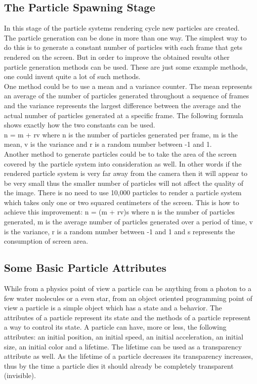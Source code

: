 \newpage
\subsection{The Particle Spawning Stage}
In this stage of the particle systems rendering cycle new particles are created. The particle generation can be done in more than one way. The simplest way to do this is to generate a constant number of particles with each frame that gets rendered on the screen. But in order to improve the obtained results other particle generation methods can be used. These are just some example methods, one could invent quite a lot of such methods.\\

One method could be to use a mean and a variance counter. The mean represents an average of the number of particles generated throughout a sequence of frames and the variance represents the largest difference between the average and the actual number of particles generated at a specific frame. The following formula shows exactly how the two constants can be used.\\
n = m + rv where n is the number of particles generated per frame, m is the mean, v is the variance and r is a random number between -1 and 1.\\

Another method to generate particles could be to take the area of the screen covered by the particle system into consideration as well. In other words if the rendered particle system is very far away from the camera then it will appear to be very small thus the smaller number of particles will not affect the quality of the image. There is no need to use 10,000 particles to render a particle system which takes only one or two squared centimeters of the screen. This is how to achieve this improvement: n = (m + rv)s where n is the number of particles generated, m is the average number of particles generated over a period of time, v is the variance, r is a random number between -1 and 1 and s represents the consumption of screen area.\\

\newpage
\subsection{Some Basic Particle Attributes}
While from a physics point of view a particle can be anything from a photon to a few water molecules or a even star, from an object oriented programming point of view a particle is a simple object which has a state and a behavior. The attributes of a particle represent its state and the methods of a particle represent a way to control its state. A particle can have, more or less, the following attributes: an initial position, an initial speed, an initial acceleration, an initial size, an initial color and a lifetime. The lifetime can be used as a transparency attribute as well. As the lifetime of a particle decreases its transparency increases, thus by the time a particle dies it should already be completely transparent (invisible).\\

